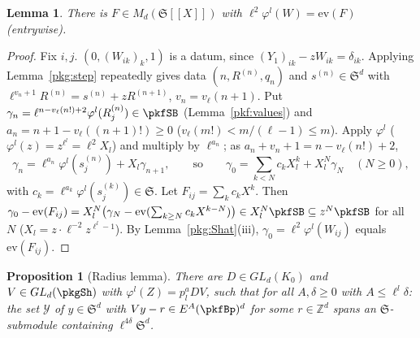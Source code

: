 \documentclass[10pt]{amsart}
\newtheorem{proposition}[theorem]{Proposition}
\newtheorem{lemma}[theorem]{Lemma}
\theoremstyle{definition}
\theoremstyle{remark}
\newcommand{\Z}{\mathbb Z}
\begin{document}
\begin{lemma}\label{pkg:series}
There is $F\in M_d(\mathfrak S[[X]])$ with $\ell^2\varphi^l(W)=\mathrm{ev}(F)$ (entrywise).
\end{lemma}

\begin{proof}
Fix $i,j$. $(0,(W_{ik})_k,1)$ is a datum, since $(Y_1)_{ik}-zW_{ik}=\delta_{ik}$. Applying
Lemma~\ref{pkg:step} repeatedly gives data $(n,R^{(n)},q_n)$ and $s^{(n)}\in\mathfrak S^d$ with
$\ell^{v_n+1}R^{(n)}=s^{(n)}+zR^{(n+1)}$, $v_n=v_\ell(n+1)$. Put $\gamma_n=\ell^{n-v_\ell(n!)+2}\varphi^l(R^{(n)}_j)
\in\pkfSB$ (Lemma~\ref{pkf:values}) and $a_n=n+1-v_\ell((n+1)!)\ge0$ ($v_\ell(m!)<m/(\ell-1)\le m$). Apply
$\varphi^l$ ($\varphi^l(z)=z^{\ell^l}=\ell^2X_l$) and multiply by $\ell^{a_n}$; as $a_n+v_n+1=n-v_\ell(n!)+2$,
\[
\gamma_n=\ell^{a_n}\varphi^l(s^{(n)}_j)+X_l\gamma_{n+1},\qquad\text{so}\qquad
\gamma_0=\textstyle\sum_{k<N}c_kX_l^k+X_l^N\gamma_N\quad(N\ge0),
\]
with $c_k=\ell^{a_k}\varphi^l(s^{(k)}_j)\in\mathfrak S$. Let $F_{ij}=\sum_kc_kX^k$. Then
$\gamma_0-\mathrm{ev}(F_{ij})=X_l^N\bigl(\gamma_N-\mathrm{ev}(\sum_{k\ge N}c_kX^{k-N})\bigr)\in X_l^N\pkfSB\subseteq
z^N\pkfSB$ for all $N$ ($X_l=z\cdot\ell^{-2}z^{\ell^l-1}$). By Lemma~\ref{pkg:Shat}(iii),
$\gamma_0=\ell^2\varphi^l(W_{ij})$ equals $\mathrm{ev}(F_{ij})$.
\end{proof}

\begin{proposition}[Radius lemma]\label{pkg:radius}
There are $D\in GL_d(K_0)$ and $V\in GL_d(\pkgSh)$ with $\varphi^l(Z)=p_l^aDV$, such that for all $A,\delta\ge0$
with $A\le\ell^l\delta$: the set $\mathcal Y$ of $y\in\mathfrak S^d$ with $Vy-r\in E^A(\pkfBp)^d$ for some
$r\in\Z^d$ spans an $\mathfrak S$-submodule containing $\ell^{4\delta}\mathfrak S^d$.
\end{proposition}
\end{document}
